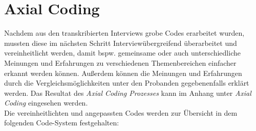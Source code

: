 \documentclass{hsflensburg}
\begin{document}
	\section{Axial Coding}

	Nachdem aus den transkribierten Interviews grobe Codes erarbeitet wurden, mussten diese im nächsten Schritt 
	Interviewübergreifend überarbeitet und vereinheitlicht werden, damit bspw. gemeinsame oder auch unterschiedliche
	Meinungen und Erfahrungen zu verschiedenen Themenbereichen einfacher erkannt werden können. Außerdem können
	die Meinungen und Erfahrungen durch die Vergleichsmöglichkeiten unter den Probanden gegebenenfalls erklärt werden. 
	Das Resultat des \textit{Axial Coding Prozesses} kann im Anhang unter \textit{Axial Coding} eingesehen werden.\\

	Die vereinheitlichten und angepassten Codes werden zur Übersicht in dem folgenden Code-System festgehalten:
\end{document}
